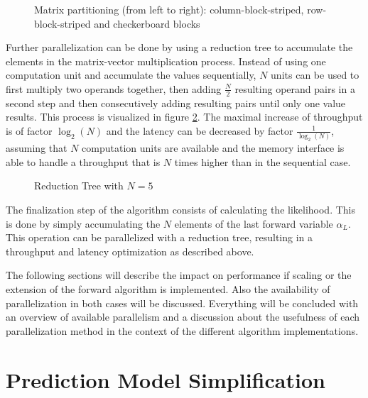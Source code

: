 \documentclass[mscthesis]{usiinfthesis}
\begin{document}
\begin{figure}
    \centering
    
    \caption{Matrix partitioning (from left to right): column-block-striped,
        row-block-striped and checkerboard blocks}
    \label{fig:matrix_partitioning}
\end{figure}

Further parallelization can be done by using a reduction tree to accumulate the
elements in the matrix-vector multiplication process. Instead of using one
computation unit and accumulate the values sequentially, $N$ units can be used
to first multiply two operands together, then adding $\frac{N}{2}$ resulting
operand pairs in a second step and then consecutively adding resulting pairs
until only one value results. This process is visualized in figure
\ref{fig:red_tree}. The maximal increase of throughput is of factor $\log_2(N)$
and the latency can be decreased by factor $\frac{1}{\log_2(N)}$, assuming that
$N$ computation units are available and the memory interface is able to handle
a throughput that is $N$ times higher than in the sequential case.

\begin{figure}
    \centering
    
    \caption{Reduction Tree with $N=5$}
    \label{fig:red_tree}
\end{figure}

The finalization step of the algorithm consists of calculating the likelihood.
This is done by simply accumulating the $N$ elements of the last forward
variable $\alpha_L$. This operation can be parallelized with a reduction tree,
resulting in a throughput and latency optimization as described above.

The following sections will describe the impact on performance if scaling or
the extension of the forward algorithm is implemented. Also the availability of
parallelization in both cases will be discussed. Everything will be concluded
with an overview of available parallelism and a discussion about the usefulness
of each parallelization method in the context of the different algorithm
implementations.

\section{Prediction Model Simplification}
\label{ch:analysis_simple}
\end{document}
